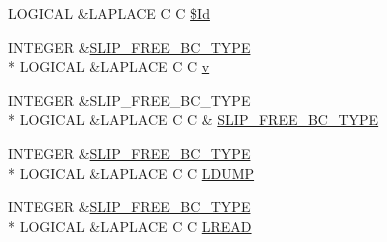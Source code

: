 \begin{DoxyCompactItemize}
L\-O\-G\-I\-C\-A\-L \&L\-A\-P\-L\-A\-C\-E C C \hyperlink{flags_8com_ae60767b8a00a3d5b1a9e070e70af7b83}{\$\-Id}
\item 
I\-N\-T\-E\-G\-E\-R \&\hyperlink{flags_8com_a6beb6f16ff7301fc1f9a031b0f564045}{S\-L\-I\-P\-\_\-\-F\-R\-E\-E\-\_\-\-B\-C\-\_\-\-T\-Y\-P\-E} \\*
L\-O\-G\-I\-C\-A\-L \&L\-A\-P\-L\-A\-C\-E C C \hyperlink{flags_8com_a9432be5aaed9ef92777eb9334811a743}{v}
\item 
I\-N\-T\-E\-G\-E\-R \&S\-L\-I\-P\-\_\-\-F\-R\-E\-E\-\_\-\-B\-C\-\_\-\-T\-Y\-P\-E \\*
L\-O\-G\-I\-C\-A\-L \&L\-A\-P\-L\-A\-C\-E C C \& \hyperlink{flags_8com_a6beb6f16ff7301fc1f9a031b0f564045}{S\-L\-I\-P\-\_\-\-F\-R\-E\-E\-\_\-\-B\-C\-\_\-\-T\-Y\-P\-E}
\item 
I\-N\-T\-E\-G\-E\-R \&\hyperlink{flags_8com_a6beb6f16ff7301fc1f9a031b0f564045}{S\-L\-I\-P\-\_\-\-F\-R\-E\-E\-\_\-\-B\-C\-\_\-\-T\-Y\-P\-E} \\*
L\-O\-G\-I\-C\-A\-L \&L\-A\-P\-L\-A\-C\-E C C \hyperlink{flags_8com_a3024fd35afb70c44fa85042b6a14c5ab}{L\-D\-U\-M\-P}
\item 
I\-N\-T\-E\-G\-E\-R \&\hyperlink{flags_8com_a6beb6f16ff7301fc1f9a031b0f564045}{S\-L\-I\-P\-\_\-\-F\-R\-E\-E\-\_\-\-B\-C\-\_\-\-T\-Y\-P\-E} \\*
L\-O\-G\-I\-C\-A\-L \&L\-A\-P\-L\-A\-C\-E C C \hyperlink{flags_8com_aa6fefd93ca36a6424e6e72230960d44c}{L\-R\-E\-A\-D}
\end{DoxyCompactItemize}


